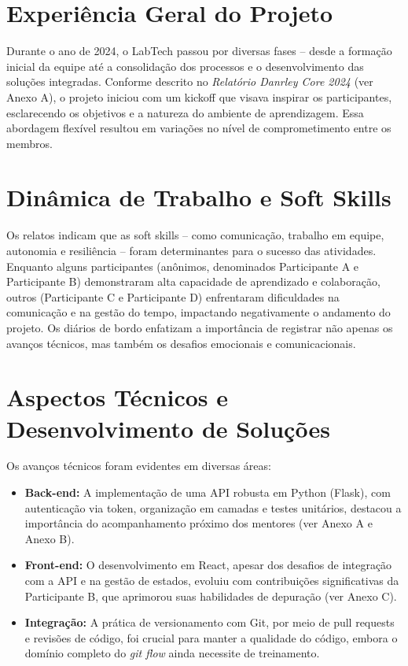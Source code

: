 \section{Experiência Geral do Projeto}
Durante o ano de 2024, o LabTech passou por diversas fases – desde a formação inicial da equipe até a consolidação dos processos e o desenvolvimento das soluções integradas. Conforme descrito no \textit{Relatório Danrley Core 2024} (ver Anexo A), o projeto iniciou com um kickoff que visava inspirar os participantes, esclarecendo os objetivos e a natureza do ambiente de aprendizagem. Essa abordagem flexível resultou em variações no nível de comprometimento entre os membros.

\section{Dinâmica de Trabalho e Soft Skills}
Os relatos indicam que as soft skills – como comunicação, trabalho em equipe, autonomia e resiliência – foram determinantes para o sucesso das atividades. Enquanto alguns participantes (anônimos, denominados Participante A e Participante B) demonstraram alta capacidade de aprendizado e colaboração, outros (Participante C e Participante D) enfrentaram dificuldades na comunicação e na gestão do tempo, impactando negativamente o andamento do projeto. Os diários de bordo enfatizam a importância de registrar não apenas os avanços técnicos, mas também os desafios emocionais e comunicacionais.

\section{Aspectos Técnicos e Desenvolvimento de Soluções}
Os avanços técnicos foram evidentes em diversas áreas:
\begin{itemize}[label=\textbullet]
    \item \textbf{Back-end:} A implementação de uma API robusta em Python (Flask), com autenticação via token, organização em camadas e testes unitários, destacou a importância do acompanhamento próximo dos mentores (ver Anexo A e Anexo B).
    \item \textbf{Front-end:} O desenvolvimento em React, apesar dos desafios de integração com a API e na gestão de estados, evoluiu com contribuições significativas da Participante B, que aprimorou suas habilidades de depuração (ver Anexo C).
    \item \textbf{Integração:} A prática de versionamento com Git, por meio de pull requests e revisões de código, foi crucial para manter a qualidade do código, embora o domínio completo do \textit{git flow} ainda necessite de treinamento.
\end{itemize}

